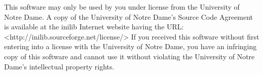 %
This software may only be used by you under license from the
University of Notre Dame.  A copy of the University of Notre Dame's
Source Code Agreement is available at the inilib Internet website
having the URL: <http://inilib.sourceforge.net/license/> If you
received this software without first entering into a license with the
University of Notre Dame, you have an infringing copy of this software
and cannot use it without violating the University of Notre Dame's
intellectual property rights.
% 
%

\def\version{}

\newif\ifpdf
\ifx\pdfoutput\undefined
   \pdffalse
\else
   \pdftrue
\fi
\ifpdf
  \usepackage[pdftex,
              colorlinks=true,
              linkcolor=blue,filecolor=blue,pagecolor=blue,urlcolor=blue
              ]{hyperref}
  \def\figsuffix{pdf}
\else
  \newcommand{\href}[2]{\underline{#2}}
  \def\figsuffix{eps}
\fi

\def\gb{\penalty10000\hskip 0pt plus 8em\penalty4800\hskip 0pt plus-8em%
\penalty10000}
\newcommand{\bind}[1]{{\raggedright \hangindent 7em\hangafter=1\tt
#1 \par \vspace{0.1in}}} 
\newcommand{\const}[1]{\protect\gb\protect{\small\sf #1}}
\newcommand{\func}[1]{\protect\gb\protect{\small\sf #1}}

\setlength{\fboxsep}{8pt}
\newcommand{\mybox}[1]{
\begin{center}
\noindent 
\fbox{\parbox[c][\height][s]{4in}{
{\tt #1}}}
\end{center}
}
